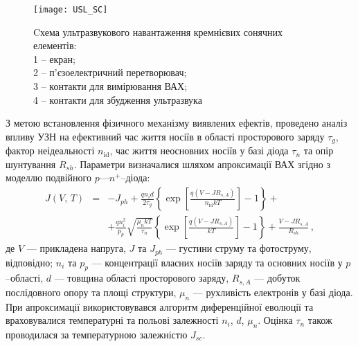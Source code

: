 \begin{SCfigure}
\texttt{[image: USL\_SC]}
\caption{\label{USL_SC}
Cхема ультразвукового навантаження кремнієвих сонячних елементів: \protect\\
1 --  екран;\protect\\
2 -- п'єзоелектричний перетворювач;\protect\\
3 -- контакти для вимірювання ВАХ;\protect\\
4 -- контакти для збудження ультразвука
}
\end{SCfigure}

З метою встановлення фізичного механізму
виявлених ефектів, проведено аналіз впливу УЗН на
ефективний час життя носіїв в області просторового заряду $\tau_{g}$,
фактор неідеальності $n_\mathrm{id}$,
час життя неосновних носіїв у базі діода $\tau_n$
та  опір шунтування $R_{sh}$.
Параметри визначалися шляхом апроксимації ВАХ згідно з моделлю подвійного $p$---$n^+$--діода:
\begin{eqnarray}
\label{eqSSCIV}
\nonumber J(V,\,T)&=&-J_{ph}+\frac{qn_id}{2\tau_{g}}\left\{\exp \left[\frac{q(V-JR_{s,A})}{n_\mathrm{id}kT}\right]-1\right\}+\\
&&+\frac{qn_i^2}{p_p}\sqrt{\frac{\mu_nkT}{\tau_n}}\left\{\exp \left[\frac{q(V-JR_{s,A})}{kT}\right]-1\right\}+\frac{V-JR_{s,A}}{R_{sh}}\,,
\end{eqnarray}
де
$V$ --- прикладена напруга,
$J$ та $J_{ph}$ --- густини струму та фотоструму, відповідно;
$n_i$ та $p_p$ --- концентрації власних носіїв заряду та основних носіїв у $p$--області,
$d$ --- товщина області просторового заряду,
$R_{s,A}$ --- добуток послідовного опору та площі структури,
$\mu_n$ --- рухливість електронів у базі діода.
При апроксимації використовувався алгоритм диференційної еволюції та враховувалися температурні та польові залежності $n_i$, $d$, $\mu_n$.
Оцінка $\tau_n$ також проводилася за температурною залежністю $J_{sc}$.

